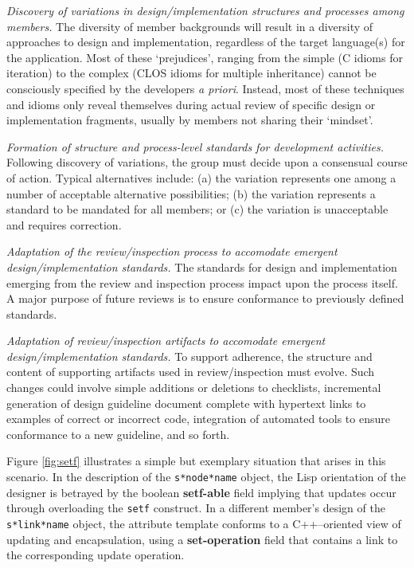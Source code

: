 \begin{itemizenoindent}
  
\item {\em Discovery of variations in design/implementation structures and processes among members.} The diversity of member backgrounds will result in a diversity of approaches to design and implementation, regardless of the target language(s) for the application.  Most of these `prejudices', ranging from the simple (C idioms for iteration) to the complex (CLOS idioms for multiple inheritance) cannot be consciously specified by the developers {\em a priori}.  Instead, most of these techniques and idioms only reveal themselves during actual review of specific design or implementation fragments, usually by members not sharing their `mindset'.
  
\item {\em Formation of structure and process-level standards for development activities.} Following discovery of variations, the group must decide upon a consensual course of action.  Typical alternatives include: (a) the variation represents one among a number of acceptable alternative possibilities; (b) the variation represents a standard to be mandated for all members; or (c) the variation is unacceptable and requires correction.
  
\item {\em Adaptation of the review/inspection process to accomodate emergent design/implementation standards.} The standards for design and implementation emerging from the review and inspection process impact upon the process itself.  A major purpose of future reviews is to ensure conformance to previously defined standards.
  
\item {\em Adaptation of review/inspection artifacts to accomodate emergent design/implementation standards.} To support adherence, the structure and content of supporting artifacts used in review/inspection must evolve.  Such changes could involve simple additions or deletions to checklists, incremental generation of design guideline document complete with hypertext links to examples of correct or incorrect code, integration of automated tools to ensure conformance to a new guideline, and so forth.
  
\end{itemizenoindent}


Figure \ref{fig:setf} illustrates a simple but exemplary situation that arises in this scenario.  In the description of the {\tt s*node*name} object, the Lisp orientation of the designer is betrayed by the boolean {\bf setf-able} field implying that updates occur through overloading the {\tt setf} construct.  In a different member's design of the {\tt s*link*name} object, the attribute template conforms to a C++--oriented view of updating and encapsulation, using a {\bf set-operation} field that contains a link to the corresponding update operation.

